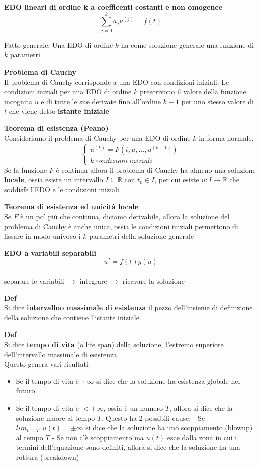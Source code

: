 \documentclass[12pt, a4paper]{article}
\begin{document}
\textbf{EDO lineari di ordine k a coefficenti costanti e non omogenee}\[\sum^{k}_{j=0}a_{j}u^{(j)}=f(t)\]

Fatto generale: Una EDO di ordine $k$ ha come soluzione generale una funzione di $k$ parametri

\textbf{Problema di Cauchy}\\Il problema di Cauchy corrisponde a una EDO con condizioni iniziali. Le condizioni
iniziali per una EDO di ordine $k$ prescrivono il valore della funzione incognita $u$ e di tutte le sue
derivate fino all'ordine $k-1$ per uno stesso valore di $t$ che viene detto \textbf{istante iniziale}

\textbf{Teorema di esistenza (Peano)}\\Consideriamo il problema di Cauchy per una EDO di ordine $k$ in forma
normale.\[\begin{cases}
        u^{(k)}=F(t,u,...,u^{(k-1)}) \\
        k\ condizioni\ iniziali
    \end{cases}\] Se la funzione $F$ è continua allora il problema di Cauchy ha almeno una soluzione \textbf{locale},
ossia esiste un intervallo $I\subseteq\mathbb{R}$ con $t_{0}\in I$, per cui esiste $u:I\to\mathbb{R}$ che
soddisfe l'EDO e le condizioni iniziali

\textbf{Teorema di esistenza ed unicità locale}\\Se $F$ è un po' più che continua, diciamo derivabile, allora la
soluzione del problema di Cauchy è anche unica, ossia le condizioni iniziali permettono di fissare in modo univoco
i $k$ parametri della soluzione generale

\textbf{EDO a variabili separabili}\[u^{I}=f(t)g(u)\]\\separare le variabili $\to$ integrare $\to$ ricavare la
soluzione

\textbf{Def}\\Si dice \textbf{intervalloo massimale di esistenza} il pezzo dell'insieme di definizione della
soluzione che contiene l'istante iniziale

\textbf{Def}\\Si dice \textbf{tempo di vita} (o life span) della soluzione, l'estremo superiore dell'intervallo
massimale di esistenza\\Questo genera vari risultati
\begin{itemize}
    \item Se il tempo di vita è $+\infty$ si dice che la soluzione ha esistenza globale nel futuro
    \item Se il tempo di vita è $<+\infty$, ossia è un numero $T$, allora si dice che la soluzione muore al tempo
          $T$. Questo ha 2 possibili cause:
          \subitem - Se $lim_{t\to T^{-}}u(t)=\pm\infty$ si dice che la soluzione ha uno scoppiamento (blowup) al tempo $T$
          \subitem - Se non c'è scoppiamento ma $u(t)$ esce dalla zona in cui i termini dell'equazione sono definiti,
          allora si dice che la soluzione ha una rottura (breakdown)
\end{itemize}
\end{document}
